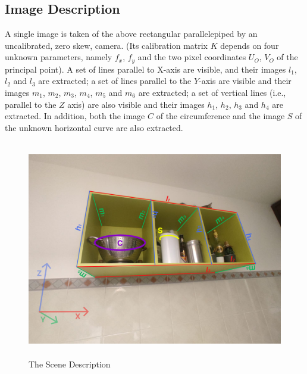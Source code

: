 \subsection{Image Description}
A single image is taken of the above rectangular parallelepiped by an uncalibrated, zero
skew, camera. (Its calibration matrix $K$ depends on four unknown parameters, namely $f_x$, $f_y$ and 
the two pixel coordinates $U_O$, $V_O$ of the principal point). A set of lines parallel to X-axis are visible, and their images $l_1$, $l_2$ and $l_3$ are extracted; a set of lines parallel to the $Y$-axis are visible and their images  $m_1$, $m_2$, $m_3$, $m_4$, $m_5$ and $m_6$ are extracted; a set of vertical lines (i.e., parallel to the $Z$
axis) are also visible and their images $h_1$, $h_2$, $h_3$ and $h_4$ are extracted.  In addition, both the image $C$ of the circumference and the image $S$ of the unknown horizontal curve are also extracted.  

\begin{figure}[!ht]
\centering
\includegraphics[height=9.5cm, width=\textwidth, keepaspectratio]{Report/Images/Introduction/Image Description.png}
\caption{\label{fig:SceneDescription}The Scene Description}
\end{figure}